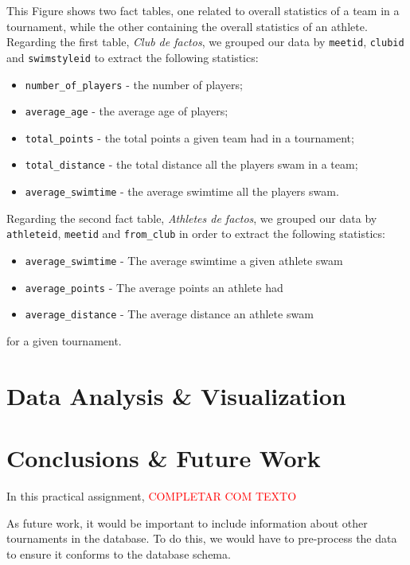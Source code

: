 \documentclass[a4paper, 11pt]{article}
\begin{document}
This Figure shows two fact tables, one related to overall statistics of a team in a tournament, while the other containing the overall statistics of an athlete. 
Regarding the first table, \textit{Club de factos}, we grouped our data by \texttt{meetid}, \texttt{clubid} and \texttt{swimstyleid} to extract the following statistics:

\begin{itemize}
    \item \texttt{number\_of\_players} - the number of players;
    \item \texttt{average\_age} - the average age of players;
    \item \texttt{total\_points} - the total points a given team had in a tournament;
    \item \texttt{total\_distance} - the total distance all the players swam in a team;
    \item \texttt{average\_swimtime} - the average swimtime all the players swam.
\end{itemize}

Regarding the second fact table, \textit{Athletes de factos}, we grouped our data by \texttt{athleteid}, \texttt{meetid} and \texttt{from\_club} in order to extract the following statistics:

\begin{itemize}
    \item \texttt{average\_swimtime} - The average swimtime a given athlete swam
    \item \texttt{average\_points} - The average points an athlete had
    \item \texttt{average\_distance} - The average distance an athlete swam
\end{itemize}

for a given tournament.

\pagebreak

\section{Data Analysis \& Visualization} \label{sec:analysis}


\pagebreak

\section{Conclusions \& Future Work} \label{sec:conclusion}

In this practical assignment, \textcolor{red}{COMPLETAR COM TEXTO}

As future work, it would be important to include information about other tournaments in the database.
To do this, we would have to pre-process the data to ensure it conforms to the database schema.
\end{document}
